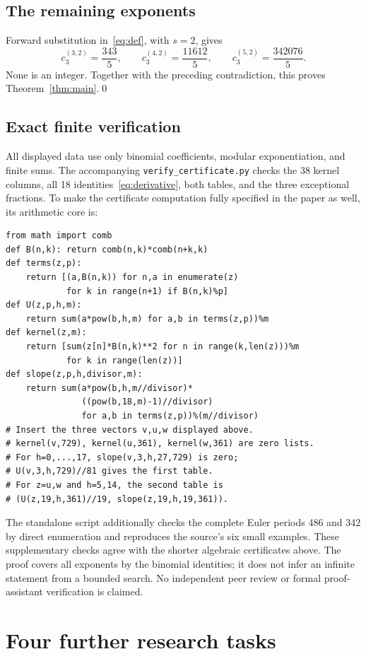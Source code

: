 \documentclass[11pt]{article}
\begin{document}
\subsection*{The remaining exponents}
Forward substitution in~\eqref{eq:def}, with $s=2$, gives
\[
 c_3^{(3,2)}=\frac{343}{5},\qquad
 c_3^{(4,2)}=\frac{11612}{5},\qquad
 c_3^{(5,2)}=\frac{342076}{5}.
\]
None is an integer. Together with the preceding contradiction, this
proves Theorem~\ref{thm:main}.\qed

\subsection*{Exact finite verification}
All displayed data use only binomial coefficients, modular exponentiation,
and finite sums. The accompanying \texttt{verify\_certificate.py} checks
the 38 kernel columns, all 18 identities~\eqref{eq:derivative}, both tables,
and the three exceptional fractions. To make the certificate computation
fully specified in the paper as well, its arithmetic core is:
\begin{verbatim}
from math import comb
def B(n,k): return comb(n,k)*comb(n+k,k)
def terms(z,p):
    return [(a,B(n,k)) for n,a in enumerate(z)
            for k in range(n+1) if B(n,k)%p]
def U(z,p,h,m):
    return sum(a*pow(b,h,m) for a,b in terms(z,p))%m
def kernel(z,m):
    return [sum(z[n]*B(n,k)**2 for n in range(k,len(z)))%m
            for k in range(len(z))]
def slope(z,p,h,divisor,m):
    return sum(a*pow(b,h,m//divisor)*
               ((pow(b,18,m)-1)//divisor)
               for a,b in terms(z,p))%(m//divisor)
# Insert the three vectors v,u,w displayed above.
# kernel(v,729), kernel(u,361), kernel(w,361) are zero lists.
# For h=0,...,17, slope(v,3,h,27,729) is zero;
# U(v,3,h,729)//81 gives the first table.
# For z=u,w and h=5,14, the second table is
# (U(z,19,h,361)//19, slope(z,19,h,19,361)).
\end{verbatim}
The standalone script additionally checks the complete Euler periods
486 and 342 by direct enumeration and reproduces the source's six
small examples. These supplementary checks agree with the shorter
algebraic certificates above. The proof covers all exponents by the
binomial identities; it does not infer an infinite statement from a
bounded search. No independent peer review or formal proof-assistant
verification is claimed.

\section*{Four further research tasks}
\end{document}
